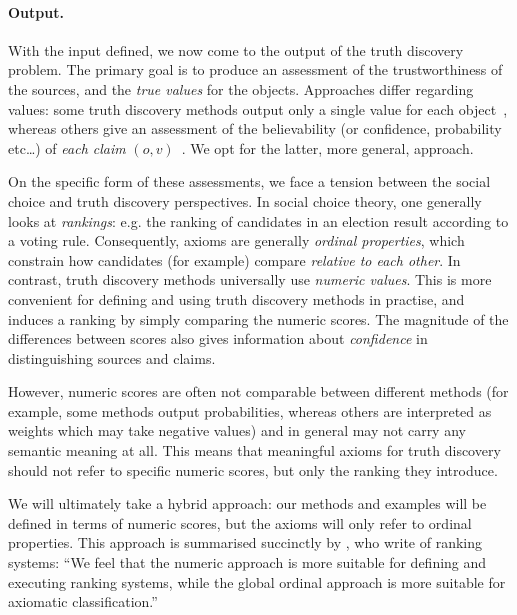 \paragraph{Output.}

With the input defined, we now come to the output of the truth discovery
problem.
The primary goal is to produce an assessment of the trustworthiness of the
sources, and the \emph{true values} for the objects. Approaches differ
regarding values: some truth discovery methods output only a single value for
each object~\cite{li2016,ding_finding_2016,yang_continuous_2018}, whereas
others give an assessment of the believability (or confidence, probability
etc\ldots) of \emph{each claim} $(o,
v)$~\cite{yin2008,pasternack2010,galland2010,zhi2015,zhang_robust_2016,zhang2018}.
We opt for the latter, more general, approach.

On the specific form of these assessments, we face a tension between the social
choice and truth discovery perspectives. In social choice theory, one generally
looks at \emph{rankings}: e.g. the ranking of candidates in an election result
according to a voting rule. Consequently, axioms are generally \emph{ordinal
properties}, which constrain how candidates (for example) compare
\emph{relative to each other}. In contrast, truth discovery methods universally
use \emph{numeric values}. This is more convenient for defining and using truth
discovery methods in practise, and induces a ranking by simply comparing the
numeric scores. The magnitude of the differences between scores also gives
information about \emph{confidence} in distinguishing sources and claims.

However, numeric scores are often not comparable between
different methods (for example, some methods output probabilities, whereas
others are interpreted as weights which may take negative values) and in
general may not carry any semantic meaning at all. This means that meaningful
axioms for truth discovery should not refer to specific numeric scores, but
only the ranking they introduce.

We will ultimately take a hybrid approach: our methods and examples will be
defined in terms of numeric scores, but the axioms will only refer to ordinal
properties. This approach is summarised succinctly by \textcite{altman2008},
who write of ranking systems: ``We feel that the numeric approach is more
suitable for defining and executing ranking systems, while the global ordinal
approach is more suitable for axiomatic classification.''

